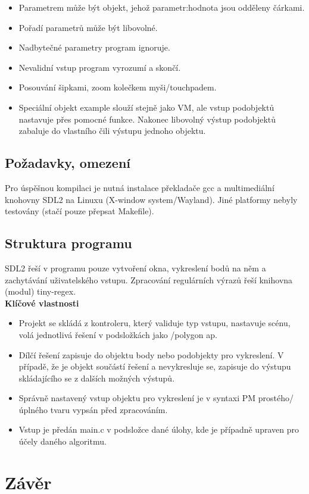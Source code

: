 \documentclass[a4paper,12pt]{report}
\begin{document}
\begin{itemize}
  \item Parametrem může být objekt, jehož parametr:hodnota jsou odděleny čárkami.
  \item Pořadí parametrů může být libovolné.
  \item Nadbytečné parametry program ignoruje.
  \item Nevalidní vstup program vyrozumí a skončí.
  \item Posouvání šipkami, zoom kolečkem myši/touchpadem.
  \item Speciální objekt example slouží stejně jako VM, ale vstup podobjektů nastavuje přes pomocné funkce. Nakonec libovolný výstup podobjektů zabaluje do vlastního čili výstupu jednoho objektu.
\end{itemize}

\section{Požadavky, omezení}
 
Pro úspěšnou kompilaci je nutná instalace překladače gcc a multimediální knohovny SDL2 na Linuxu (X-window system/Wayland). Jiné platformy nebyly testovány  (stačí pouze přepsat Makefile).
 
 
\section{Struktura programu}
 
 SDL2 řeší v programu pouze vytvoření okna, vykreslení bodů na něm a zachytávání uživatelského vstupu.\cite{sdl2} Zpracování regulárních výrazů řeší knihovna (modul) tiny-regex.
\\
 
\textbf{Klíčové vlastnosti}

 \begin{itemize}
  \item Projekt se skládá z kontroleru, který validuje typ vstupu, nastavuje scénu, volá jednotlivá řešení v podsložkách jako /polygon ap.
  \item Dílčí řešení zapisuje do objektu body nebo podobjekty pro vykreslení. V případě, že je objekt součástí řešení a nevykresluje se, zapisuje do výstupu skládajícího se z dalších možných výstupů.
  \item Správně nastavený vstup objektu pro vykreslení je v syntaxi PM prostého/úplného tvaru vypsán před zpracováním.
  \item Vstup je předán main.c v podsložce dané úlohy, kde je případně upraven pro účely daného algoritmu.
\end{itemize}

\chapter{Závěr}



\end{document}
